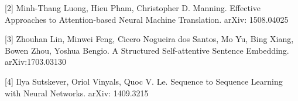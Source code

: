 \documentclass{article}
\begin{document}
[2] Minh-Thang Luong, Hieu Pham, Christopher D. Manning. Effective Approaches to Attention-based Neural Machine Translation. arXiv: 1508.04025
 
[3] Zhouhan Lin, Minwei Feng, Cicero Nogueira dos Santos, Mo Yu, Bing Xiang, Bowen Zhou, Yoshua Bengio. A Structured Self-attentive Sentence Embedding. arXiv:1703.03130

[4] Ilya Sutskever, Oriol Vinyals, Quoc V. Le. Sequence to Sequence Learning with Neural Networks. arXiv: 1409.3215
\end{document}
